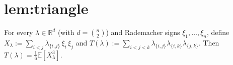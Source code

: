 \chapter{lem:triangle}\label{chap:lem_triangle}
\begin{lemma}
\label{lem:triangle}
For every $\lambda \in \mathbb{R}^d$ (with $d = \binom{n}{2}$) and Rademacher
signs $\xi_1, \dots, \xi_n$, define $X_\lambda := \sum_{i<j}
\lambda_{\{i,j\}}\,\xi_i\,\xi_j$ and
$T(\lambda) := \sum_{i<j<k}\lambda_{\{i,j\}}\lambda_{\{i,k\}}\lambda_{\{j,k\}}$.
Then $T(\lambda) = \tfrac16 \mathbb{E}[X_\lambda^3]$.
\end{lemma}
